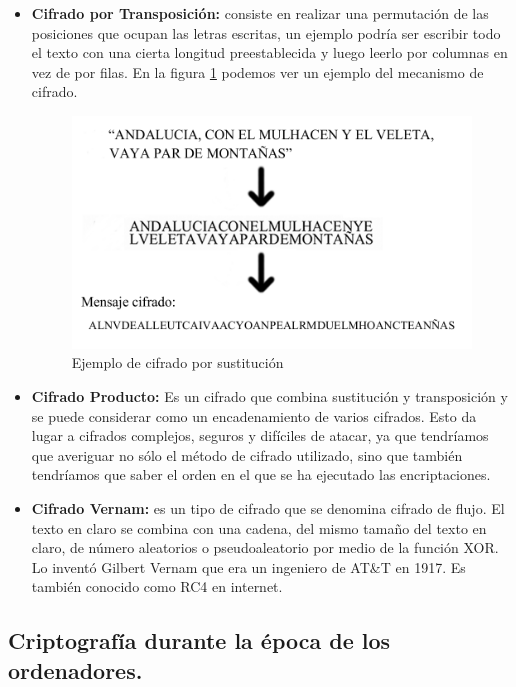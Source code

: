 \begin{itemize}
	\item \textbf{Cifrado por Transposición:} consiste en realizar una permutación de las posiciones que ocupan las letras escritas, un ejemplo podría ser escribir todo el texto con una cierta longitud preestablecida y luego leerlo por columnas en vez de por filas. En la figura \ref{fig:cifradoTransposicion} podemos ver un ejemplo del mecanismo de cifrado.  

\begin{figure}[h]
  \centering
    \includegraphics[scale=0.4]{./ConocimientosPrevios/imagenes/cifradoTransposicion.png}
  \caption{Ejemplo de cifrado por sustitución}
  \label{fig:cifradoTransposicion}
\end{figure}	

	\item \textbf{Cifrado Producto:} Es un cifrado que combina sustitución y transposición y se puede considerar como un encadenamiento de varios cifrados. Esto da lugar a cifrados complejos, seguros y difíciles de atacar, ya que tendríamos que averiguar no sólo el método de cifrado utilizado, sino que también tendríamos que saber el orden en el que se ha ejecutado las encriptaciones.

	\item \textbf{Cifrado Vernam:} es un tipo de cifrado que se denomina cifrado de flujo. El texto en claro se combina con una cadena, del mismo tamaño del texto en claro, de número aleatorios o pseudoaleatorio por medio de la función XOR. Lo inventó Gilbert Vernam que era un ingeniero de AT\&T en 1917. Es también conocido como RC4 en internet.  
	
\end{itemize}

\subsection{Criptografía durante la época de los ordenadores.}

